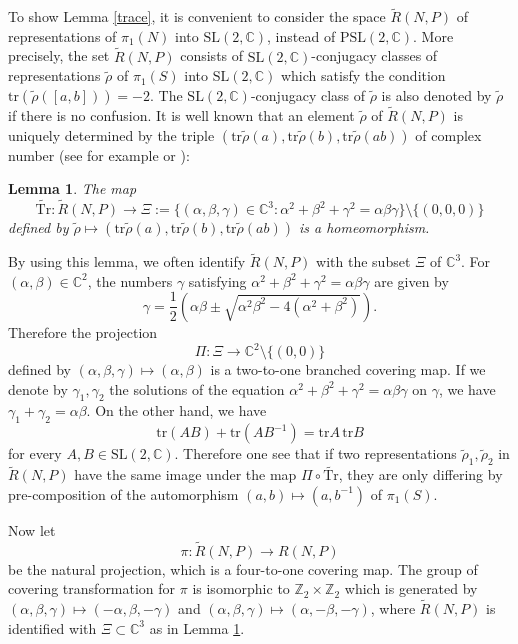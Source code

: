 \documentclass[12pt]{article}
\theoremstyle{plain}
\newtheorem{lem}[thm]{Lemma}
\theoremstyle{definition}
\theoremstyle{remark}
\newcommand{\C}{\mathbb C}
\newcommand{\Z}{\mathbb Z}
\newcommand{\alp}{\alpha}
\newcommand{\wt}{\widetilde}
\newcommand{\sm}{\setminus}
\newcommand{\tr}{{\mathrm{tr}}}
\newcommand{\Tr}{{\mathrm{Tr}}}
\newcommand{\psl}{{\mathrm{PSL}}(2,\mathbb C)}
\newcommand{\ssl}{{\mathrm{SL}}(2,\mathbb C)}
\begin{document}
To show Lemma \ref{trace}, 
it is convenient to consider the space $\wt R(N,P)$ of 
representations of $\pi_1(N)$ into $\ssl$,  instead of $\psl$.  
More precisely, the set $\wt R(N,P)$ consists of 
$\ssl$-conjugacy classes of representations $\tilde \rho$ of 
$\pi_1(S)$ into $\ssl$ which satisfy the condition $\tr (\tilde\rho([a,b]))=-2$. 
The $\ssl$-conjugacy class of $\tilde \rho$ is also denoted by $\tilde \rho$ 
if there is no confusion. 
It is well known that an element $\tilde \rho$ 
of $\wt R(N,P)$ is uniquely determined by the triple 
$(\tr\tilde \rho(a),\tr\tilde \rho(b),\tr\tilde \rho(ab))$ of complex number 
(see for example \cite{Bo} or \cite{Go}): 

\begin{lem}\label{Bow}
The map 
$$
\wt \Tr: \wt R(N,P) \to \Xi:=\{(\alpha,\beta,\gamma)  \in \C^3 
: \alpha^2+\beta^2+\gamma^2=\alpha\beta\gamma\} \sm \{(0,0,0)\}
$$
defined by  $\tilde\rho \mapsto (\tr\tilde \rho(a),\tr\tilde \rho(b),\tr\tilde \rho(ab))$ 
is a homeomorphism. 
\end{lem}


By using this lemma, we often identify  $\wt R(N,P)$ with the subset $\Xi$ of $\C^3$. 
For $(\alpha,\beta) \in \C^2$, the numbers $\gamma$ satisfying 
$\alpha^2+\beta^2+\gamma^2=\alpha\beta\gamma$
are given by
\begin{equation*}
\gamma=\frac{1}{2}\left( \alpha \beta \pm \sqrt{\alpha^2\beta^2-4(\alpha^2+\beta^2)} \right). 
\end{equation*}
Therefore the projection 
$$
\Pi:\Xi \to \C^2 \sm\{(0,0)\}
$$
defined by $(\alp,\beta,\gamma) \mapsto (\alp,\beta)$ 
is a  two-to-one branched covering map. 
If we denote by $\gamma_1,\gamma_2$ 
the solutions of the equation $\alpha^2+\beta^2+\gamma^2=\alpha\beta\gamma$  
on $\gamma$, we have  $\gamma_1+\gamma_2=\alp\beta$. 
On the other hand, we have 
$$
\tr (AB)+\tr(AB^{-1})=\tr A \, \tr B
$$
for every $A,B \in \ssl$.  
Therefore one see that if two representations $\tilde \rho_1, \tilde \rho_2$ in $\wt R(N,P)$ 
have the same image under the map 
$\Pi \circ \wt \Tr$, 
they are only differing by pre-composition of the automorphism $(a,b) \mapsto (a,b^{-1})$ of $\pi_1(S)$. 

Now let 
$$
\pi:\wt R(N,P) \to R(N,P)
$$
be the natural projection, which is  a four-to-one  covering map. 
The group of covering transformation for $\pi$ is isomorphic to 
$\Z_2 \times \Z_2$ which is generated by $(\alp,\beta,\gamma) \mapsto (-\alp,\beta, -\gamma)$ 
and $(\alp,\beta,\gamma) \mapsto  (\alp,-\beta,-\gamma)$, 
where $\wt R(N,P)$ is identified with $\Xi \subset \C^3$ as in Lemma \ref{Bow}. 
 
\end{document}

